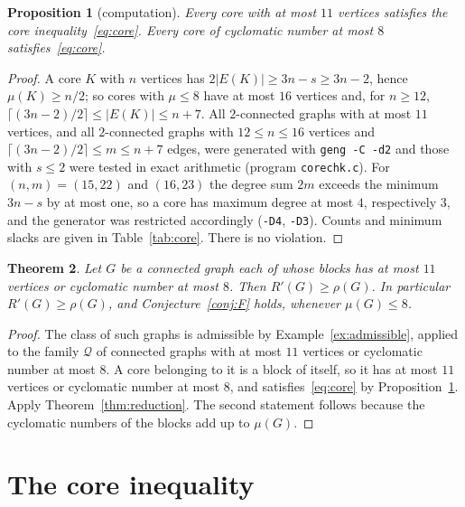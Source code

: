 \documentclass[11pt]{amsart}
\newtheorem{theorem}{Theorem}[section]
\newtheorem{proposition}[theorem]{Proposition}
\theoremstyle{definition}
\newcommand{\Rp}{R'}
\begin{document}
\begin{proposition}[computation]\label{prop:smallcores}
Every core with at most $11$ vertices satisfies the core inequality~\eqref{eq:core}. Every core of cyclomatic number at
most $8$ satisfies~\eqref{eq:core}.
\end{proposition}

\begin{proof}
A core $K$ with $n$ vertices has $2|E(K)|\ge3n-s\ge3n-2$, hence $\mu(K)\ge n/2$; so cores with $\mu\le8$ have at most
$16$ vertices and, for $n\ge12$, $\lceil(3n-2)/2\rceil\le|E(K)|\le n+7$. All $2$-connected graphs with at most $11$
vertices, and all $2$-connected graphs with $12\le n\le16$ vertices and $\lceil(3n-2)/2\rceil\le m\le n+7$ edges, were
generated with \texttt{geng -C -d2} and those with $s\le2$ were tested in exact arithmetic (program
\texttt{corechk.c}). For $(n,m)=(15,22)$ and $(16,23)$ the degree sum $2m$ exceeds the minimum $3n-s$ by at most one,
so a core has maximum degree at most $4$, respectively $3$, and the generator was restricted accordingly
(\texttt{-D4}, \texttt{-D3}). Counts and minimum slacks are given in Table~\ref{tab:core}. There is no violation.
\end{proof}

\begin{theorem}\label{thm:smallblocks}
Let $G$ be a connected graph each of whose blocks has at most $11$ vertices or cyclomatic number at most $8$. Then
$\Rp(G)\ge\rho(G)$. In particular $\Rp(G)\ge\rho(G)$, and Conjecture~\ref{conj:F} holds, whenever $\mu(G)\le8$.
\end{theorem}

\begin{proof}
The class of such graphs is admissible by Example~\ref{ex:admissible}, applied to the family $\mathcal Q$ of
connected graphs with at most $11$ vertices or cyclomatic number at most $8$. A core belonging to it is a block of itself,
so it has at most $11$ vertices or cyclomatic number at most $8$, and satisfies~\eqref{eq:core} by
Proposition~\ref{prop:smallcores}. Apply Theorem~\ref{thm:reduction}. The second statement follows because the
cyclomatic numbers of the blocks add up to $\mu(G)$.
\end{proof}

\section{The core inequality}\label{sec:core}
\end{document}
